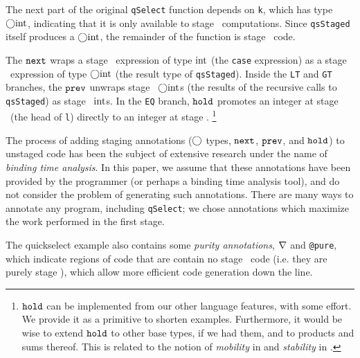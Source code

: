 \begin{concretesyntax}
The next part of the original \texttt{qSelect} function depends on \texttt{k},
which has type $\bigcirc{\rm int}$, indicating that it is only available to stage
\bbtwo\ computations. Since \texttt{qsStaged} itself produces a $\bigcirc{\rm int}$,
the remainder of the function is stage \bbtwo\ code.

The ${\tt next}$ wraps a stage \bbtwo\ expression of type ${\rm int}$ (the \texttt{case}
expression) as a stage \bbone\ expression of type $\bigcirc{\rm int}$ (the result type
of \texttt{qsStaged}). Inside the \texttt{LT} and \texttt{GT} branches, the
${\tt prev}$ unwraps stage \bbone\ $\bigcirc{\rm int}$s (the results of the recursive calls
to \texttt{qsStaged}) as stage \bbtwo\ ${\rm int}$s. In the \texttt{EQ} branch,
${\tt hold}$ promotes an integer at stage \bbone\ (the head of \texttt{l}) directly
to an integer at stage \bbtwo.%
\footnote{${\tt hold}$ can be implemented from our other language features, with
some effort. We provide it as a primitive to shorten examples. Furthermore, it
would be wise to extend ${\tt hold}$ to other base types, if we had them, and to
products and sums thereof.  This is related to the notion of {\em mobility} in
\cite{murphy05} and {\em stability} in \cite{krishnaswami13}.}

The process of adding staging annotations ($\bigcirc$ types, ${\tt next}$, ${\tt prev}$, and
${\tt hold}$) to unstaged code has been the subject of extensive research under the
name of \emph{binding time analysis}. In this paper, we assume that these
annotations have been provided by the programmer (or perhaps a binding time
analysis tool), and do not consider the problem of generating such annotations.
There are many ways to annotate any program, including \texttt{qSelect}; we
chose annotations which maximize the work performed in the first stage.




The quickselect example also contains some {\em purity annotations}, 
$\nabla$ and \texttt{@pure}, which indicate regions of code that are 
contain no stage \bbtwo\ code (i.e. they are purely stage \bbone),
which allow more efficient code generation down the line.


\end{concretesyntax}
